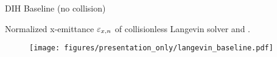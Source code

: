 \begin{frame}[c]{DIH Baseline (no collision)}

    \centering
    \item Normalized x-emittance $\varepsilon_{x,n}$ of collisionless Langevin solver and \pcubem.
    \begin{figure}
        \begin{center}
            \texttt{[image: figures/presentation\_only/langevin\_baseline.pdf]}
        \end{center}
        \label{fig:gamma_test}
    \end{figure}
\end{frame}

